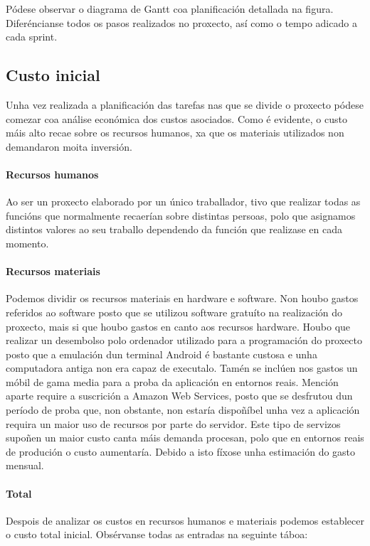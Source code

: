 Pódese observar o diagrama de Gantt coa planificación detallada na figura.  Diferéncianse todos os pasos realizados no proxecto, así como o tempo adicado a cada sprint.

\subsection{Custo inicial}
Unha vez realizada a planificación das tarefas nas que se divide o proxecto pódese comezar coa análise económica dos custos asociados. Como é evidente, o custo máis alto recae sobre os recursos humanos, xa que os materiais utilizados non demandaron moita inversión.

\paragraph{Recursos humanos}
Ao ser un proxecto elaborado por un único traballador, tivo que realizar todas as funcións que normalmente recaerían sobre distintas persoas, polo que asignamos distintos valores ao seu traballo dependendo da función que realizase en cada momento.


\paragraph{Recursos materiais}
Podemos dividir os recursos materiais en hardware e software. Non houbo gastos referidos ao software posto que se utilizou software gratuíto na realización do proxecto, mais si que houbo gastos en canto aos recursos hardware. Houbo que realizar un desembolso polo ordenador utilizado para a programación do proxecto posto que a emulación dun terminal Android é bastante custosa e unha computadora antiga non era capaz de executalo. Tamén se inclúen nos gastos un móbil de gama media para a proba da aplicación en entornos reais. Mención aparte require a suscrición a Amazon Web Services, posto que se desfrutou dun período de proba que, non obstante, non estaría dispoñíbel unha vez a aplicación requira un maior uso de recursos por parte do servidor. Este tipo de servizos supoñen un maior custo canta máis demanda procesan, polo que en entornos reais de produción o custo aumentaría. Debido a isto fíxose unha estimación do gasto mensual.


\paragraph{Total}
Despois de analizar os custos en recursos humanos e materiais podemos establecer o custo total inicial. Obsérvanse todas as entradas na seguinte táboa:


